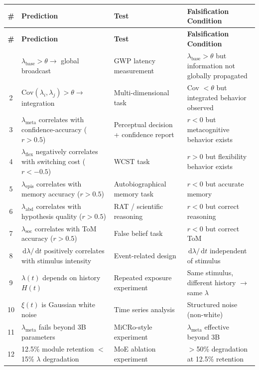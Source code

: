 \documentclass[11pt,a4paper]{article}
\theoremstyle{definition}
\theoremstyle{remark}
\newcommand{\diff}{\,\mathrm{d}}
\begin{document}
\begin{longtable}{|c|p{3.5cm}|p{3cm}|p{4cm}|}
\hline
\textbf{\#} & \textbf{Prediction} & \textbf{Test} & \textbf{Falsification Condition} \\
\hline
\endfirsthead
\hline
\textbf{\#} & \textbf{Prediction} & \textbf{Test} & \textbf{Falsification Condition} \\
\hline
\endhead
\hline
\endfoot
1 & $\lambda_{\text{base}} > \theta \rightarrow$ global broadcast & GWP latency measurement & $\lambda_{\text{base}} > \theta$ but information not globally propagated \\
\hline
2 & $\text{Cov}(\lambda_i, \lambda_j) > \theta \rightarrow$ integration & Multi-dimensional task & Cov $< \theta$ but integrated behavior observed \\
\hline
3 & $\lambda_{\text{meta}}$ correlates with confidence-accuracy ($r > 0.5$) & Perceptual decision + confidence report & $r < 0$ but metacognitive behavior exists \\
\hline
4 & $\lambda_{\text{flex}}$ negatively correlates with switching cost ($r < -0.5$) & WCST task & $r > 0$ but flexibility behavior exists \\
\hline
5 & $\lambda_{\text{epis}}$ correlates with memory accuracy ($r > 0.5$) & Autobiographical memory task & $r < 0$ but accurate memory \\
\hline
6 & $\lambda_{\text{abd}}$ correlates with hypothesis quality ($r > 0.5$) & RAT / scientific reasoning & $r < 0$ but correct reasoning \\
\hline
7 & $\lambda_{\text{soc}}$ correlates with ToM accuracy ($r > 0.5$) & False belief task & $r < 0$ but correct ToM \\
\hline
8 & $\diff\lambda/\diff t$ positively correlates with stimulus intensity & Event-related design & $\diff\lambda/\diff t$ independent of stimulus \\
\hline
9 & $\lambda(t)$ depends on history $H(t)$ & Repeated exposure experiment & Same stimulus, different history $\rightarrow$ same $\lambda$ \\
\hline
10 & $\xi(t)$ is Gaussian white noise & Time series analysis & Structured noise (non-white) \\
\hline
11 & $\lambda_{\text{meta}}$ fails beyond 3B parameters & MiCRo-style experiment & $\lambda_{\text{meta}}$ effective beyond 3B \\
\hline
12 & 12.5\% module retention $<$ 15\% $\lambda$ degradation & MoE ablation experiment & $>$50\% degradation at 12.5\% retention \\

\end{longtable}
\end{document}
